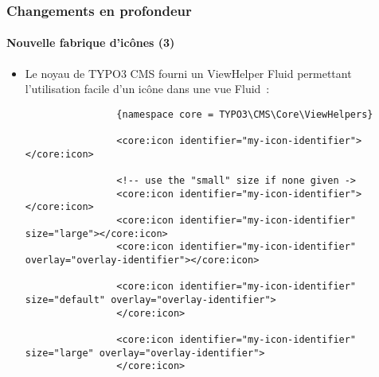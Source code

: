 \begin{frame}[fragile]
	\frametitle{Changements en profondeur}
	\framesubtitle{Nouvelle fabrique d'icônes (3)}

	\lstset{basicstyle=\tiny\ttfamily}

	\begin{itemize}

		\item Le noyau de TYPO3 CMS fourni un ViewHelper Fluid permettant l'utilisation facile d'un icône dans une vue Fluid~:

			\begin{lstlisting}
				{namespace core = TYPO3\CMS\Core\ViewHelpers}

				<core:icon identifier="my-icon-identifier"></core:icon>

				<!-- use the "small" size if none given ->
				<core:icon identifier="my-icon-identifier"></core:icon>
				<core:icon identifier="my-icon-identifier" size="large"></core:icon>
				<core:icon identifier="my-icon-identifier" overlay="overlay-identifier"></core:icon>

				<core:icon identifier="my-icon-identifier" size="default" overlay="overlay-identifier">
				</core:icon>

				<core:icon identifier="my-icon-identifier" size="large" overlay="overlay-identifier">
				</core:icon>
			\end{lstlisting}

	\end{itemize}

\end{frame}


